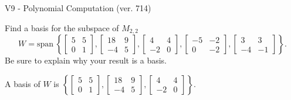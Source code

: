 \begin{exercise}
  \begin{exerciseTitle}V9 - Polynomial Computation (ver. 714)\end{exerciseTitle}
  \begin{exerciseStatement}
    Find a basis for the subspace of \(M_{2,2}\) 
\[W=\mathrm{span}\ \left\{\left[\begin{array}{cc}
5 & 5 \\
0 & 1
\end{array}\right] , \left[\begin{array}{cc}
18 & 9 \\
-4 & 5
\end{array}\right] , \left[\begin{array}{cc}
4 & 4 \\
-2 & 0
\end{array}\right] , \left[\begin{array}{cc}
-5 & -2 \\
0 & -2
\end{array}\right] , \left[\begin{array}{cc}
3 & 3 \\
-4 & -1
\end{array}\right]\right\}.\]
 Be sure to explain why your result is a basis.


  \end{exerciseStatement}
  \begin{exerciseAnswer}
   A basis of \(W\) is  \(\left\{\left[\begin{array}{cc}
5 & 5 \\
0 & 1
\end{array}\right] , \left[\begin{array}{cc}
18 & 9 \\
-4 & 5
\end{array}\right] , \left[\begin{array}{cc}
4 & 4 \\
-2 & 0
\end{array}\right]\right\}\).
  


  \end{exerciseAnswer}
\end{exercise}